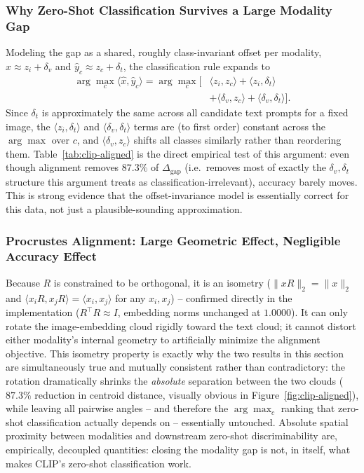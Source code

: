 \subsubsection{Why Zero-Shot Classification Survives a Large Modality Gap}

Modeling the gap as a shared, roughly class-invariant offset per modality,
$\hat{x}\approx z_i+\delta_v$ and $\hat{y}_c\approx z_c+\delta_t$, the
classification rule expands to
\[
  \begin{aligned}
  \arg\max_c\langle\hat{x},\hat{y}_c\rangle
  = \arg\max_c\big[&\langle z_i,z_c\rangle+\langle z_i,\delta_t\rangle \\
  &+\langle\delta_v,z_c\rangle+\langle\delta_v,\delta_t\rangle\big].
  \end{aligned}
\]
Since $\delta_t$ is approximately the same across all candidate text
prompts for a fixed image, the $\langle z_i,\delta_t\rangle$ and
$\langle\delta_v,\delta_t\rangle$ terms are (to first order) constant
across the $\arg\max$ over $c$, and $\langle\delta_v,z_c\rangle$ shifts all
classes similarly rather than reordering them. Table~\ref{tab:clip-aligned}
is the direct empirical test of this argument: even though alignment
removes $87.3\%$ of $\Delta_{\text{gap}}$ (i.e.\ removes most of exactly
the $\delta_v,\delta_t$ structure this argument treats as
classification-irrelevant), accuracy barely moves. This is strong evidence
that the offset-invariance model is essentially correct for this data, not
just a plausible-sounding approximation.

\subsubsection{Procrustes Alignment: Large Geometric Effect, Negligible Accuracy Effect}

Because $R$ is constrained to be orthogonal, it is an isometry
($\|xR\|_2=\|x\|_2$ and $\langle x_iR,x_jR\rangle=\langle x_i,x_j\rangle$
for any $x_i,x_j$) -- confirmed directly in the implementation
($R^\top R\approx I$, embedding norms unchanged at $1.0000$). It can only
rotate the image-embedding cloud rigidly toward the text cloud; it cannot
distort either modality's internal geometry to artificially minimize the
alignment objective. This isometry property is exactly why the two results
in this section are simultaneously true and mutually consistent rather
than contradictory: the rotation dramatically shrinks the \emph{absolute}
separation between the two clouds ($87.3\%$ reduction in centroid
distance, visually obvious in Figure~\ref{fig:clip-aligned}), while
leaving all pairwise angles -- and therefore the $\arg\max_c$ ranking that
zero-shot classification actually depends on -- essentially untouched.
Absolute spatial proximity between modalities and downstream zero-shot
discriminability are, empirically, decoupled quantities: closing the
modality gap is not, in itself, what makes CLIP's zero-shot classification
work.
